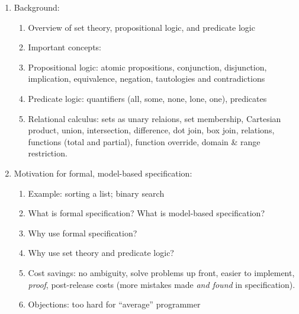 \documentclass[11pt]{article}
\begin{document}
\begin{enumerate}

 \item Background:

   \begin{enumerate}

   \item Overview of set theory, propositional logic, and predicate logic
     
   \item Important concepts: 
     
   \item Propositional logic: atomic propositions, conjunction, disjunction, implication, equivalence, negation, tautologies and contradictions
     
   \item Predicate logic: quantifiers (all, some, none, lone, one), predicates

   \item Relational calculus: sets as unary relaions, set membership, Cartesian product, union, intersection, difference, dot join, box join, relations, functions (total and partial), function override,  domain \& range restriction.

   \end{enumerate}
 
 \item Motivation for formal, model-based specification:

 \begin{enumerate}

 \item Example: sorting a list; binary search

 \item What is formal specification? What is model-based specification?
   
 \item Why use formal specification? 

 \item Why use set theory and predicate logic?
   
 \item Cost savings: no ambiguity, solve problems up front, easier to implement, \emph{proof}, post-release costs (more mistakes made \emph{and found} in specification).
   
 \item Objections: too hard for ``average'' programmer

 \end{enumerate}


\end{enumerate}
\end{document}
